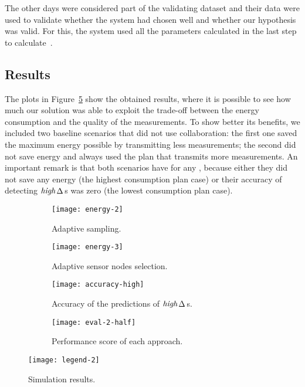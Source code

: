 \documentclass{llncs}
\newcommand{\ourDelta}[2][]{\ensuremath{\Delta\textsuperscript{\text{#1}}
\textsubscript{\text{#2}}}}
\newcommand{\high}[1][ ]{\ensuremath{\text{\emph{high}}#1}}
\newcommand{\highDelta}[2][]{\high{\ourDelta[#1]{#2}}}
\begin{document}
The other  days were considered part of the validating dataset and their 
data were used to validate whether the system had chosen well and whether our 
hypothesis was valid. For this, the system used all the parameters 
calculated in the last step to calculate~.






\subsection{Results}



The plots in Figure~\ref{fig:results} show the obtained results, where it is 
possible to see how much our solution was able to exploit the trade-off between 
the energy consumption and the quality of the measurements. To show better its 
benefits, we included two baseline scenarios that did not use collaboration: the 
first one saved the maximum energy possible by transmitting less measurements; 
the second did not save energy and always used the plan that transmits more 
measurements. An important remark is that both scenarios have  
for any , because either they did not save any energy (the highest 
consumption plan case) or their accuracy of detecting \highDelta{}s was zero 
(the lowest consumption plan case).

\begin{figure}[h]
	\centering
\begin{subfigure}[t]{0.4\textwidth}
		\centering
		
\texttt{[image: energy-2]}
		\caption{Adaptive sampling.}
		\label{fig:results-energy-2}
	\end{subfigure}\qquad
	\begin{subfigure}[t]{0.4\textwidth}
		\centering
		
\texttt{[image: energy-3]}
		\caption{Adaptive sensor nodes selection.}
		\label{fig:results-energy-3}
	\end{subfigure}\qquad
	\begin{subfigure}[t]{0.4\textwidth}
		\centering
		
\texttt{[image: accuracy-high]}
		\caption{Accuracy of the predictions of \highDelta{}s.}
		\label{fig:results-accuracy_high}
	\end{subfigure}\qquad
	\begin{subfigure}[t]{0.4\textwidth}
		\centering
		
\texttt{[image: eval-2-half]}
		\caption{Performance score of each approach.}
		\label{fig:results-eval}
	\end{subfigure}

	\centering
	\texttt{[image: legend-2]}
	\label{fig:results-legend}
	
	\caption{Simulation results.}
	\label{fig:results}
	
\end{figure}
\end{document}

